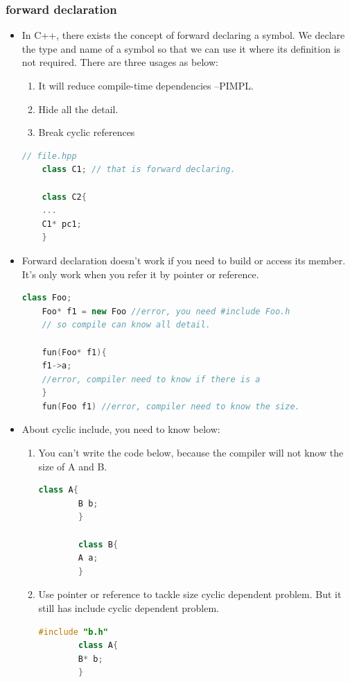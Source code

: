 \documentclass[a4paper,12pt,twoside]{book}
\begin{document}
\subsubsection{forward declaration}

\begin{itemize}
	\item In C++, there exists the concept of forward declaring a symbol. We declare the type and name of a symbol so that we can use it where its definition is not required. There are three usages as below:
	\begin{enumerate}
		\item It will reduce compile-time dependencies --PIMPL.
		\item Hide all the detail. 
		\item Break cyclic references
	\end{enumerate}
	
	\begin{lstlisting}[frame=single, language=c++]
	// file.hpp
	class C1; // that is forward declaring.
	
	class C2{
	...
	C1* pc1;
	}
	\end{lstlisting}
	
	\item Forward declaration doesn't work if you need to build or access its member. It's only work when you refer it by pointer or reference.
	
	\begin{lstlisting}[frame=single, language=c++]
	class Foo;
	Foo* f1 = new Foo //error, you need #include Foo.h
	// so compile can know all detail.
	
	fun(Foo* f1){
	f1->a; 
	//error, compiler need to know if there is a 
	}
	fun(Foo f1) //error, compiler need to know the size.
	\end{lstlisting}
	
	\item About cyclic include, you need to know below:
	\begin{enumerate}
		\item You can't write the code below, because the compiler will not know the size of A and B. 
		\begin{lstlisting}[frame=single, language=c++]
		class A{
		B b;
		}
		
		class B{
		A a;
		}
		\end{lstlisting}
		\item Use pointer or reference to tackle size cyclic dependent problem. But it still has include cyclic dependent problem. 
		\begin{lstlisting}[frame=single, language=c++]
		#include "b.h"
		class A{
		B* b;
		}
		

\end{lstlisting}
\end{enumerate}
\end{itemize}
\end{document}
